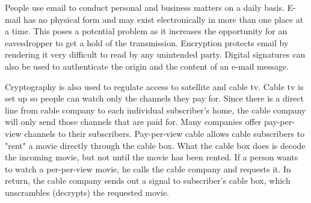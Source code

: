 \documentclass[conference]{IEEEtran}
\begin{document}
People use email to conduct personal and business matters on a daily basis. E-mail has no physical form and may exist electronically in more than one place at a time. This poses a potential problem as it increases the opportunity for an eavesdropper to get a hold of the transmission. Encryption protects email by rendering it very difficult to read by any unintended party. Digital signatures can also be used to authenticate the origin and the content of an e-mail message.

Cryptography is also used to regulate access to satellite and cable tv. Cable tv is set up so people can watch only the channels they pay for. Since there is a direct line from cable company to each individual subscriber's home, the cable company will only send those channels that are paid for. Many companies offer pay-per-view channels to their subscribers. Pay-per-view cable allows cable subscribers to "rent" a movie directly through the cable box. What the cable box does is decode the incoming movie, but not until the movie has been rented. If a person wants to watch a per-per-view movie, he calls the cable company and requests it. In return, the cable company sends out a signal to subscriber's cable box, which unscrambles (decrypts) the requested movie.

 


%
%

\end{document}
